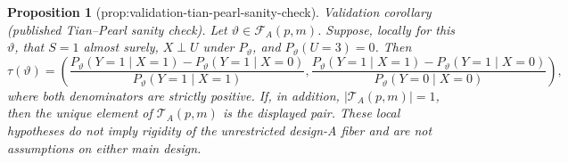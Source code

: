 \documentclass{article}
\newtheorem{proposition}{Proposition}
\begin{document}
\begin{proposition}[prop:validation-tian-pearl-sanity-check]\label{prop:validation-tian-pearl-sanity-check}
Validation corollary (published Tian--Pearl sanity check). Let \(\vartheta\in\mathcal F_A(p,m)\). Suppose, locally for this \(\vartheta\), that \(S=1\) almost surely, \(X\perp U\) under \(P_{\vartheta}\), and \(P_{\vartheta}(U=3)=0\). Then
\[
\tau(\vartheta)=\left(
\frac{P_{\vartheta}(Y=1\mid X=1)-P_{\vartheta}(Y=1\mid X=0)}{P_{\vartheta}(Y=1\mid X=1)},
\frac{P_{\vartheta}(Y=1\mid X=1)-P_{\vartheta}(Y=1\mid X=0)}{P_{\vartheta}(Y=0\mid X=0)}
\right),
\]
where both denominators are strictly positive. If, in addition, \(\lvert\mathcal T_A(p,m)\rvert=1\), then the unique element of \(\mathcal T_A(p,m)\) is the displayed pair. These local hypotheses do not imply rigidity of the unrestricted design-A fiber and are not assumptions on either main design.
\end{proposition}
\end{document}
